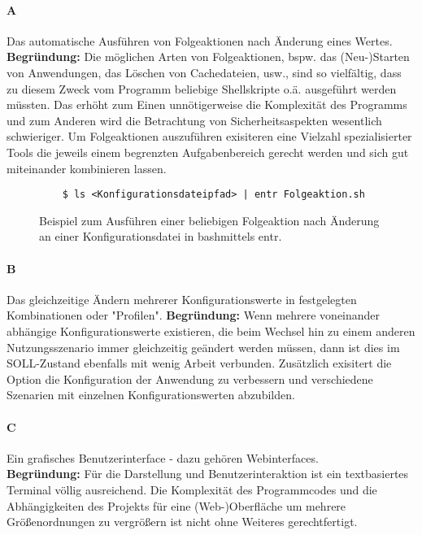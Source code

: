 \documentclass[a4paper,11pt]{article}
\begin{document}
\paragraph{A}
Das automatische Ausführen von Folgeaktionen nach Änderung eines Wertes. \textbf{Begründung:}
Die möglichen Arten von Folgeaktionen, bspw. das (Neu-)Starten von Anwendungen,
das Löschen von Cachedateien, usw., sind so vielfältig, dass zu diesem Zweck vom
Programm beliebige Shellskripte o.ä. ausgeführt werden müssten. Das erhöht zum Einen
unnötigerweise die Komplexität des Programms und zum Anderen wird die Betrachtung von
Sicherheitsaspekten wesentlich schwieriger. Um Folgeaktionen auszuführen exisiteren
eine Vielzahl spezialisierter Tools die jeweils einem begrenzten Aufgabenbereich
gerecht werden und sich gut miteinander kombinieren lassen.

\begin{figure}[!ht]
	\caption[cdba]{Beispiel zum Ausführen einer beliebigen Folgeaktion nach
		Änderung an einer Konfigurationsdatei in bash\footnotemark mittels entr.\footnotemark}
	\begin{verbatim}
    $ ls <Konfigurationsdateipfad> | entr Folgeaktion.sh
\end{verbatim}
\end{figure}

\paragraph{B}
Das gleichzeitige Ändern mehrerer Konfigurationswerte in festgelegten Kombinationen
oder "Profilen". \textbf{Begründung:} Wenn mehrere voneinander abhängige Konfigurationswerte
existieren, die beim Wechsel hin zu einem anderen Nutzungsszenario immer gleichzeitig
geändert werden müssen, dann ist dies im SOLL-Zustand ebenfalls mit wenig Arbeit
verbunden. Zusätzlich exisitert die Option die Konfiguration der Anwendung zu
verbessern und verschiedene Szenarien mit einzelnen Konfigurationswerten abzubilden.
\paragraph{C}
Ein grafisches Benutzerinterface - dazu gehören Webinterfaces. \\
\textbf{Begründung:} Für die Darstellung und Benutzerinteraktion ist ein
textbasiertes Terminal völlig ausreichend. Die Komplexität des Programmcodes und
die Abhängigkeiten des Projekts für eine (Web-)Oberfläche um mehrere
Größenordnungen zu vergrößern ist nicht ohne Weiteres gerechtfertigt.
\end{document}
